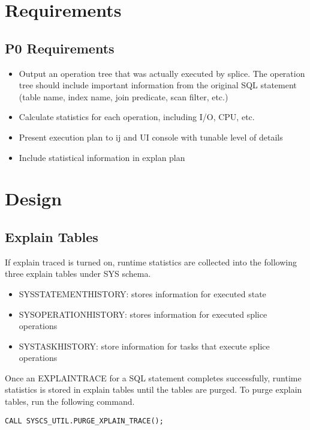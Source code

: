 \documentclass{article}
\begin{document}
\section{Requirements}
\subsection{P0 Requirements}
\begin{itemize}
  \item Output an operation tree that was actually executed by splice. The operation tree should include important information from the original SQL statement (table name, index name, join predicate, scan filter, etc.)
  \item Calculate statistics for each operation, including I/O, CPU, etc.
  \item Present execution plan to ij and UI console with tunable level of details
  \item Include statistical information in explan plan
\end{itemize}

\section{Design}
\subsection{Explain Tables}
If explain traced is turned on, runtime statistics are collected into the following three explain tables under SYS schema.
\begin{itemize}
  \item SYSSTATEMENTHISTORY: stores information for executed state
  \item SYSOPERATIONHISTORY: stores information for executed splice operations
  \item SYSTASKHISTORY: store information for tasks that execute splice operations
\end{itemize}
Once an EXPLAINTRACE for a SQL statement completes successfully, runtime statistics is stored in explain tables until the tables are purged. To purge explain tables, run the following command.
\begin{lstlisting}
CALL SYSCS_UTIL.PURGE_XPLAIN_TRACE();
\end{lstlisting}
\end{document}

